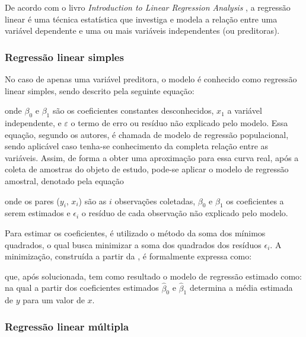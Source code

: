 De acordo com o livro \textit{Introduction to Linear Regression Analysis} \cite{linear_regression}, a regressão linear é uma técnica estatística que investiga e modela a relação entre uma variável dependente e uma ou mais variáveis independentes (ou preditoras).

\subsubsection{Regressão linear simples}

No caso de apenas uma variável preditora, o modelo é conhecido como regressão linear simples, sendo descrito pela seguinte equação:


onde $\beta_0$ e $\beta_1$ são os coeficientes constantes desconhecidos, $x_1$ a variável independente, e $\varepsilon$ o termo de erro ou resíduo não explicado pelo modelo. Essa equação, segundo os autores, é chamada de modelo de regressão populacional, sendo aplicável caso tenha-se conhecimento da completa relação entre as variáveis. Assim, de forma a obter uma aproximação para essa curva real, após a coleta de amostras do objeto de estudo, pode-se aplicar o modelo de regressão amostral, denotado pela equação 


onde os pares ($y_i$, $x_i$) são as $i$ observações coletadas, $\beta_0$ e $\beta_1$ os coeficientes a serem estimados e $\epsilon_i$ o resíduo de cada observação não explicado pelo modelo.

Para estimar os coeficientes, é utilizado o método da soma dos mínimos quadrados, o qual busca minimizar a soma dos quadrados dos resíduos $\epsilon_i$. A minimização, construída a partir da , é formalmente expressa como:

que, após solucionada, tem como resultado o modelo de regressão estimado como:
 na qual a partir dos coeficientes estimados $\hat{\beta}_0$  e $\hat{\beta}_1$ determina a média estimada de $y$ para um valor de $x$.

\subsubsection{Regressão linear múltipla}

